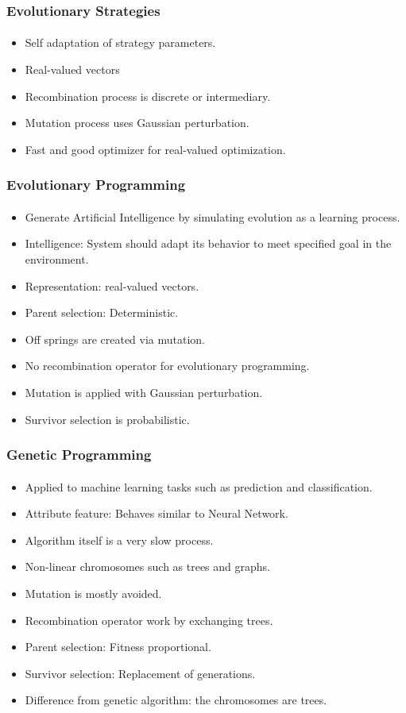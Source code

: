 \frame
{
	\frametitle{Evolutionary Strategies}
	\framesubtitle{}

	\begin{itemize}
		\item Self adaptation of strategy parameters.
		\item Real-valued vectors
		\item Recombination process is discrete or intermediary.
		\item Mutation process uses Gaussian perturbation.
		\item Fast and good optimizer for real-valued optimization.
	\end{itemize}
}

\frame
{
	\frametitle{Evolutionary Programming}
	\framesubtitle{}

	\begin{itemize}
		\item Generate Artificial Intelligence by simulating evolution as a learning process.
		\item Intelligence: System should adapt its behavior to meet specified goal in the environment.
		\item Representation: real-valued vectors.
		\item Parent selection: Deterministic.
		\item Off springs are created via mutation.
		\item No recombination operator for evolutionary programming.
		\item Mutation is applied with Gaussian perturbation.
		\item Survivor selection is probabilistic.
	\end{itemize}
}

\frame
{
	\frametitle{Genetic Programming}
	\framesubtitle{}

	\begin{itemize}
		\item Applied to machine learning tasks such as prediction and classification.
		\item Attribute feature: Behaves similar to Neural Network.
		\item Algorithm itself is a very slow process.
		\item Non-linear chromosomes such as trees and graphs.
		\item Mutation is mostly avoided.
		\item Recombination operator work by exchanging trees.
		\item Parent selection: Fitness proportional.
		\item Survivor selection: Replacement of generations.
		\item Difference from genetic algorithm: the chromosomes are trees.
	\end{itemize}
}

